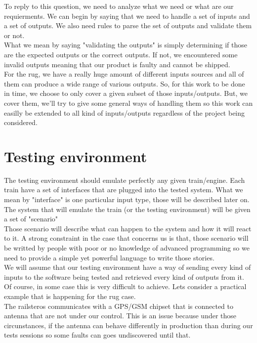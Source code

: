 \documentclass[12pt]{article}
\begin{document}
To reply to this question, we need to analyze what we need or what are our requierments. We can begin by saying that we need to handle a set of inputs and a set of outputs. We also need rules to parse the set of outputs and validate them or not.\\

What we mean by saying "validating the outputs" is simply determining if those are the expected outputs or the correct outputs. If not, we encountered some invalid outputs meaning that our product is faulty and cannot be shipped.\\

For the \gls{rug}, we have a really huge amount of different inputs sources and all of them can produce a wide range of various outputs. So, for this work to be done in time, we choose to only cover a given subset of those inputs/outputs. But, we cover them, we'll try to give some general ways of handling them so this work can easilly be extended to all kind of inputs/outputs regardless of the project being considered.


\section{Testing environment}

The testing environment should emulate perfectly any given train/engine. Each train have a set of interfaces that are plugged into the tested system. What we mean by "interface" is one particular input type, those will be described later on. The system that will emulate the train (or the testing environment) will be given a set of "scenario"\\

Those scenario will describe what can happen to the system and how it will react to it. A strong constraint in the case that concerns us is that, those scenario will be writted by people with poor or no knowledge of advanced programming so we need to provide a simple yet powerful language to write those stories.\\

We will assume that our testing environment have a way of sending every kind of inputs to the software being tested and retrieved every kind of outputs from it. Of course, in some case this is very difficult to achieve. Lets consider a practical example that is happening for the \gls{rug} case.\\

The \gls{railsteros} communicates with a GPS/GSM chipset that is connected to antenna that are not under our control. This is an issue because under those circunstances, if the antenna can behave differently in production than during our tests sessions so some faults can goes undiscovered until that.\\
\end{document}
